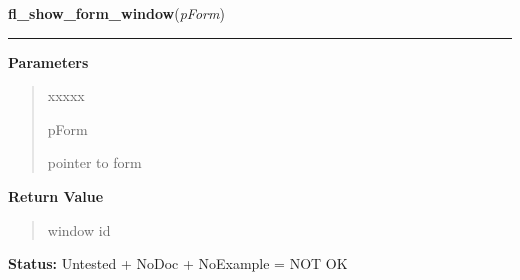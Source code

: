     \vspace{0.5ex}

\hspace{.8\funcindent}\begin{boxedminipage}{\funcwidth}

    \raggedright \textbf{fl\_show\_form\_window}(\textit{pForm})

    \vspace{-1.5ex}

    \rule{\textwidth}{0.5\fboxrule}
\setlength{\parskip}{2ex}
\setlength{\parskip}{1ex}
      \textbf{Parameters}
      \vspace{-1ex}

      \begin{quote}
        \begin{Ventry}{xxxxx}

          \item[pForm]

          pointer to form

        \end{Ventry}

      \end{quote}

      \textbf{Return Value}
    \vspace{-1ex}

      \begin{quote}
      window id

      \end{quote}

\textbf{Status:} Untested + NoDoc + NoExample = NOT OK



    \end{boxedminipage}

    \label{xformslib:library:fl_adjust_form_size}

    \vspace{0.5ex}


